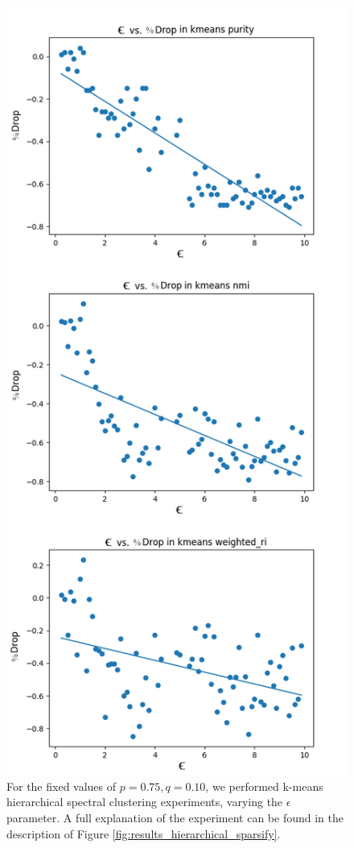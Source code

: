 \documentclass{article}
\begin{document}
\begin{figure}[H]
    \label{fig:results_kmeans_sparsify}
    \centering
    \includegraphics[width=.60\textwidth]{results/results_kmeans_sparsify.png}
    \caption[Sparsified k-means spectral clustering for $p=0.75,q=0.10$]{For the fixed values of $p=0.75,q=0.10$, we performed k-means hierarchical spectral clustering experiments, varying the $\epsilon$ parameter. A full explanation of the experiment can be found in the description of Figure \ref{fig:results_hierarchical_sparsify}.}
\end{figure}
\end{document}
